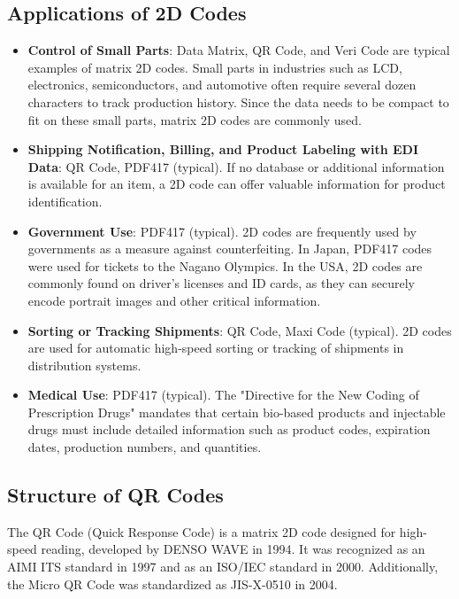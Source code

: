 \subsection{Applications of 2D Codes}
\begin{itemize}
	\item \textbf{Control of Small Parts}: Data Matrix, QR Code, and Veri Code are typical examples of matrix 2D codes. Small parts in industries such as LCD, electronics, semiconductors, and automotive often require several dozen characters to track production history. Since the data needs to be compact to fit on these small parts, matrix 2D codes are commonly used.
	\item \textbf{Shipping Notification, Billing, and Product Labeling with EDI Data}: QR Code, PDF417 (typical). If no database or additional information is available for an item, a 2D code can offer valuable information for product identification.
	\item \textbf{Government Use}: PDF417 (typical). 2D codes are frequently used by governments as a measure against counterfeiting. In Japan, PDF417 codes were used for tickets to the Nagano Olympics. In the USA, 2D codes are commonly found on driver's licenses and ID cards, as they can securely encode portrait images and other critical information.
	\item \textbf{Sorting or Tracking Shipments}: QR Code, Maxi Code (typical). 2D codes are used for automatic high-speed sorting or tracking of shipments in distribution systems.
	\item \textbf{Medical Use}: PDF417 (typical). The "Directive for the New Coding of Prescription Drugs" mandates that certain bio-based products and injectable drugs must include detailed information such as product codes, expiration dates, production numbers, and quantities.
\end{itemize}


\subsection{Structure of QR Codes}
The QR Code (Quick Response Code) is a matrix 2D code designed for high-speed reading, developed by DENSO WAVE in 1994. It was recognized as an AIMI ITS standard in 1997 and as an ISO/IEC standard in 2000. Additionally, the Micro QR Code was standardized as JIS-X-0510 in 2004.

